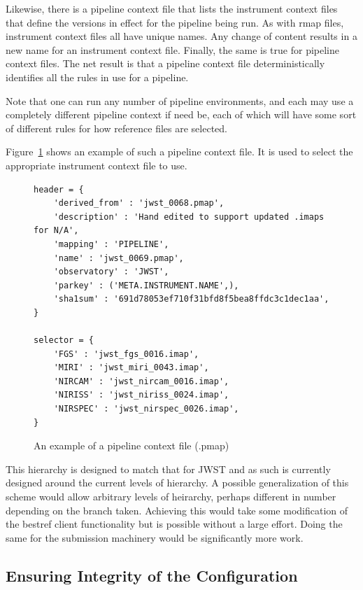 \documentclass[final,authoryear,5p,times,twocolumn]{elsarticle}
\begin{document}
Likewise, there is a pipeline context file that lists the instrument context
files that define the versions in effect for the pipeline being run. As with
rmap files, instrument context files all have unique names. Any change of
content results in a new name for an instrument context file. Finally, the same
is true for pipeline context files. The net result is that a pipeline context
file deterministically identifies all the rules in use for a pipeline. 

Note that one can run any number of pipeline environments, and each may use a
completely different pipeline context if need be, each of which will have some
sort of different rules for how reference files are selected.

Figure~\ref{fig:example_pipeline_context} shows an example of such a pipeline context file.
It is used to select the appropriate instrument context file to use.

\begin{figure}
\begin{mdframed}
\begin{verbatim}
header = {
    'derived_from' : 'jwst_0068.pmap',
    'description' : 'Hand edited to support updated .imaps for N/A',
    'mapping' : 'PIPELINE',
    'name' : 'jwst_0069.pmap',
    'observatory' : 'JWST',
    'parkey' : ('META.INSTRUMENT.NAME',),
    'sha1sum' : '691d78053ef710f31bfd8f5bea8ffdc3c1dec1aa',
}

selector = {
    'FGS' : 'jwst_fgs_0016.imap',
    'MIRI' : 'jwst_miri_0043.imap',
    'NIRCAM' : 'jwst_nircam_0016.imap',
    'NIRISS' : 'jwst_niriss_0024.imap',
    'NIRSPEC' : 'jwst_nirspec_0026.imap',
}
\end{verbatim}
\end{mdframed}
\caption{An example of a pipeline context file (.pmap)}
\label{fig:example_pipeline_context}
\end{figure}


This hierarchy is designed to match that for JWST and as such is currently
designed around the current levels of hierarchy. A possible generalization
of this scheme would allow arbitrary levels of heirarchy, perhaps
different in number depending on the branch taken. Achieving this would
take some modification of the bestref client functionality but is possible
without a large effort. Doing the same for the submission machinery would 
be significantly more work. 

\subsection{Ensuring Integrity of the Configuration}
\end{document}
